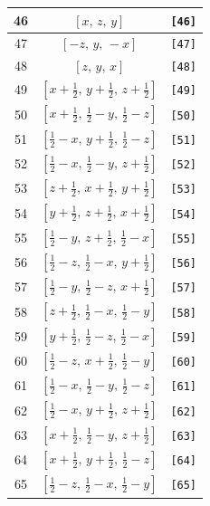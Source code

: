 \documentclass[fleqn,8pt]{jsarticle}
\begin{document}
\begin{longtable}{ccc}
46 & $\left[ x,\, z,\, y \right]$ & {\tt [46]} \\ \hline
47 & $\left[ - z,\, y,\, - x \right]$ & {\tt [47]} \\ \hline
48 & $\left[ z,\, y,\, x \right]$ & {\tt [48]} \\ \hline
49 & $\left[ x + \frac{1}{2},\, y + \frac{1}{2},\, z + \frac{1}{2} \right]$ & {\tt [49]} \\ \hline
50 & $\left[ x + \frac{1}{2},\, \frac{1}{2} - y,\, \frac{1}{2} - z \right]$ & {\tt [50]} \\ \hline
51 & $\left[ \frac{1}{2} - x,\, y + \frac{1}{2},\, \frac{1}{2} - z \right]$ & {\tt [51]} \\ \hline
52 & $\left[ \frac{1}{2} - x,\, \frac{1}{2} - y,\, z + \frac{1}{2} \right]$ & {\tt [52]} \\ \hline
53 & $\left[ z + \frac{1}{2},\, x + \frac{1}{2},\, y + \frac{1}{2} \right]$ & {\tt [53]} \\ \hline
54 & $\left[ y + \frac{1}{2},\, z + \frac{1}{2},\, x + \frac{1}{2} \right]$ & {\tt [54]} \\ \hline
55 & $\left[ \frac{1}{2} - y,\, z + \frac{1}{2},\, \frac{1}{2} - x \right]$ & {\tt [55]} \\ \hline
56 & $\left[ \frac{1}{2} - z,\, \frac{1}{2} - x,\, y + \frac{1}{2} \right]$ & {\tt [56]} \\ \hline
57 & $\left[ \frac{1}{2} - y,\, \frac{1}{2} - z,\, x + \frac{1}{2} \right]$ & {\tt [57]} \\ \hline
58 & $\left[ z + \frac{1}{2},\, \frac{1}{2} - x,\, \frac{1}{2} - y \right]$ & {\tt [58]} \\ \hline
59 & $\left[ y + \frac{1}{2},\, \frac{1}{2} - z,\, \frac{1}{2} - x \right]$ & {\tt [59]} \\ \hline
60 & $\left[ \frac{1}{2} - z,\, x + \frac{1}{2},\, \frac{1}{2} - y \right]$ & {\tt [60]} \\ \hline
61 & $\left[ \frac{1}{2} - x,\, \frac{1}{2} - y,\, \frac{1}{2} - z \right]$ & {\tt [61]} \\ \hline
62 & $\left[ \frac{1}{2} - x,\, y + \frac{1}{2},\, z + \frac{1}{2} \right]$ & {\tt [62]} \\ \hline
63 & $\left[ x + \frac{1}{2},\, \frac{1}{2} - y,\, z + \frac{1}{2} \right]$ & {\tt [63]} \\ \hline
64 & $\left[ x + \frac{1}{2},\, y + \frac{1}{2},\, \frac{1}{2} - z \right]$ & {\tt [64]} \\ \hline
65 & $\left[ \frac{1}{2} - z,\, \frac{1}{2} - x,\, \frac{1}{2} - y \right]$ & {\tt [65]} \\ \hline

\end{longtable}
\end{document}
